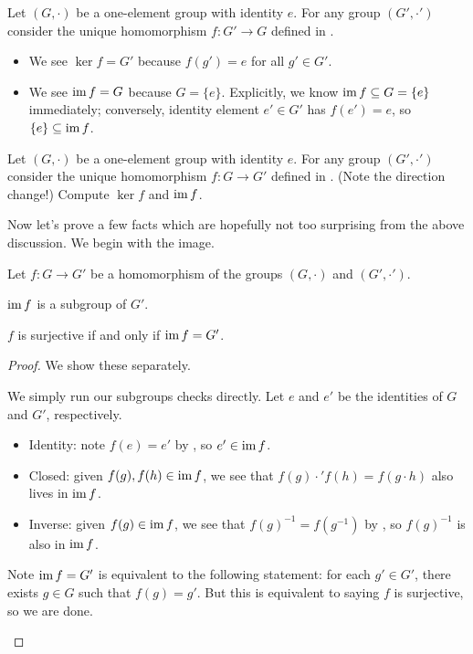 \documentclass[../notes.tex]{subfiles}
\begin{document}
\begin{example}
    Let $(G,\cdot)$ be a one-element group with identity $e$. For any group $(G',\cdot')$ consider the unique homomorphism $f\colon G'\to G$ defined in .
    \begin{itemize}
        \item We see $\ker f=G'$ because $f(g')=e$ for all $g'\in G'$.
        \item We see $\operatorname{im} f=G$ because $G=\{e\}$. Explicitly, we know $\operatorname{im} f\subseteq G=\{e\}$ immediately; conversely, identity element $e'\in G'$ has $f(e')=e$, so $\{e\}\subseteq\operatorname{im} f$.
    \end{itemize}
\end{example}
\begin{exe}
    Let $(G,\cdot)$ be a one-element group with identity $e$. For any group $(G',\cdot')$ consider the unique homomorphism $f\colon G\to G'$ defined in . (Note the direction change!) Compute $\ker f$ and $\operatorname{im} f$.
\end{exe}
Now let's prove a few facts which are hopefully not too surprising from the above discussion. We begin with the image.
\begin{lemma} \label{lem:im-subgroup}
    Let $f\colon G\to G'$ be a homomorphism of the groups $(G,\cdot)$ and $(G',\cdot')$.
    \begin{listalph}
        \item $\operatorname{im} f$ is a subgroup of $G'$.
        \item $f$ is surjective if and only if $\operatorname{im} f=G'$.
    \end{listalph}
\end{lemma}
\begin{proof}
    We show these separately.
    \begin{listalph}
        \item We simply run our subgroups checks directly. Let $e$ and $e'$ be the identities of $G$ and $G'$, respectively.
        \begin{itemize}
            \item Identity: note $f(e)=e'$ by , so $e'\in\operatorname{im} f$.
            \item Closed: given $f(g),f(h)\in\operatorname{im} f$, we see that $f(g)\cdot'f(h)=f(g\cdot h)$ also lives in $\operatorname{im} f$.
            \item Inverse: given $f(g)\in\operatorname{im} f$, we see that $f(g)^{-1}=f\left(g^{-1}\right)$ by , so $f(g)^{-1}$ is also in $\operatorname{im} f$.
        \end{itemize}
        \item Note $\operatorname{im} f=G'$ is equivalent to the following statement: for each $g'\in G'$, there exists $g\in G$ such that $f(g)=g'$. But this is equivalent to saying $f$ is surjective, so we are done.
        \qedhere
    \end{listalph}
\end{proof}
\end{document}
